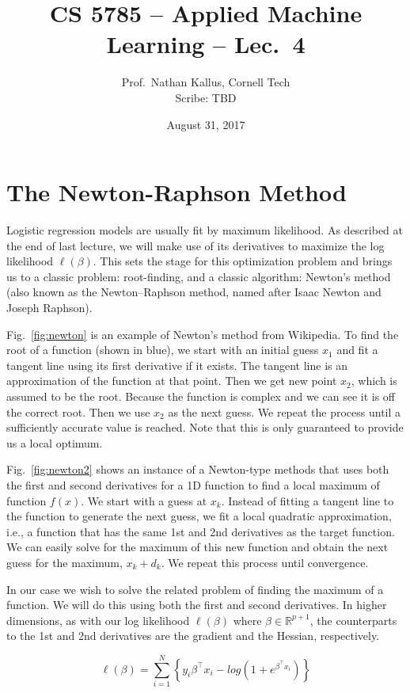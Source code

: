 \documentclass[a4paper]{article}
\title{CS 5785 -- Applied Machine Learning -- Lec.\ 4}
\author{Prof.\ Nathan Kallus, Cornell Tech\\Scribe: TBD}
\date{August 31, 2017}
\begin{document}
\maketitle

\section{The Newton-Raphson Method}
Logistic regression models are usually fit by maximum likelihood. As described at the end of last lecture, we will make use of its derivatives to maximize the log likelihood $\ell(\beta)$. This sets the stage for this optimization problem and brings us to a classic problem: root-finding, and a classic algorithm: Newton's method (also known as the Newton–Raphson method, named after Isaac Newton and Joseph Raphson). 

Fig.\ \ref{fig:newton} is an example of Newton's method from Wikipedia. To find the root of a function (shown in blue), we start with an initial guess $x_1$ and fit a tangent line using its first derivative if it exists. The tangent line is an approximation of the function at that point. Then we get new point $x_2$, which is assumed to be the root. Because the function is complex and we can see it is off the correct root. Then we use $x_2$ as the next guess. We repeat the process until a sufficiently accurate value is reached. Note that this is only guaranteed to provide us a local optimum.

Fig.\ \ref{fig:newton2} shows an instance of a Newton-type methods that uses both the first and second derivatives for a 1D function to find a local maximum of function $f(x)$. We start with a guess at $x_k$. Instead of fitting a tangent line to the function to generate the next guess, we fit a local quadratic approximation, i.e., a function that has the same 1st and 2nd derivatives as the target function. We can easily solve for the maximum of this new function and obtain the next guess for the maximum, $x_k+d_k$. We repeat this process until convergence.

In our case we wish to solve the related problem of finding the maximum of a function. We will do this using both the first and second derivatives. In higher dimensions, as with our log likelihood $\ell(\beta)$ where $\beta\in\mathbb{R}^{p+1}$, the counterparts to the 1st and 2nd derivatives are the gradient and the Hessian, respectively.
 

\begin{equation}
\ell(\beta) = \sum_{i=1}^N \left \{ y_i \beta ^\top x_i -  log(1+ e^{\beta ^\top x_i}) \right \}
\label{eqn:llgrad}
	\end{equation}
    
\end{document}
